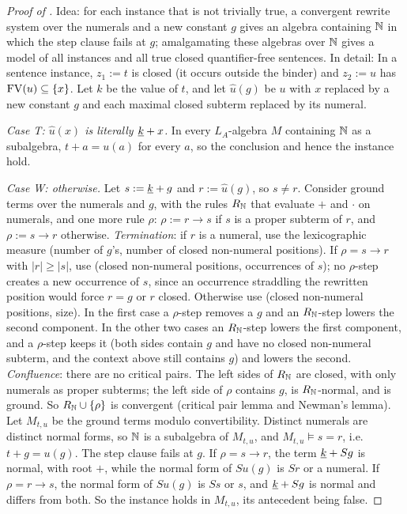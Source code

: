 \begin{proof}[Proof of ]
Idea: for each instance that is not trivially true, a convergent rewrite system over the numerals and a new constant
$g$ gives an algebra containing $\mathbb{N}$ in which the step clause fails at $g$; amalgamating these algebras over $\mathbb{N}$ gives
a model of all instances and all true closed quantifier-free sentences. In detail:
In a sentence instance, $z_1:=t$ is closed (it occurs outside the binder) and $z_2:=u$ has $\mathrm{FV}(u)\subseteq\{x\}$.
Let $k$ be the value of $t$, and let $\hat u(g)$ be $u$ with $x$ replaced by a new constant $g$ and each maximal closed
subterm replaced by its numeral.

\emph{Case T: $\hat u(x)$ is literally $\underline{k}+x$.} In every $L_A$-algebra $M$ containing $\mathbb{N}$ as a subalgebra, $t+a=u(a)$
for every $a$, so the conclusion and hence the instance hold.

\emph{Case W: otherwise.} Let $s:=\underline{k}+g$ and $r:=\hat u(g)$, so $s\ne r$. Consider ground terms over the numerals and
$g$, with the rules $R_{\mathbb{N}}$ that evaluate $+$ and $\cdot$ on numerals, and one more rule $\rho$: $\rho:=r\to s$ if $s$ is a
proper subterm of $r$, and $\rho:=s\to r$ otherwise. \emph{Termination}: if $r$ is a numeral, use the lexicographic
measure (number of $g$'s, number of closed non-numeral positions). If $\rho=s\to r$ with $|r|\ge|s|$, use (closed
non-numeral positions, occurrences of $s$); no $\rho$-step creates a new occurrence of $s$, since an occurrence straddling
the rewritten position would force $r=g$ or $r$ closed. Otherwise use (closed non-numeral positions, size). In the
first case a $\rho$-step removes a $g$ and an $R_{\mathbb{N}}$-step lowers the second component. In the other two cases an
$R_{\mathbb{N}}$-step lowers the first component, and a $\rho$-step keeps it (both sides contain $g$ and have no closed
non-numeral subterm, and the context above still contains $g$) and lowers the second. \emph{Confluence}: there are no critical pairs. The left sides of $R_{\mathbb{N}}$ are closed, with only numerals as
proper subterms; the left side of $\rho$ contains $g$, is $R_{\mathbb{N}}$-normal, and is ground. So $R_{\mathbb{N}}\cup\{\rho\}$ is convergent
(critical pair lemma and Newman's lemma). Let $M_{t,u}$ be the ground terms modulo convertibility. Distinct numerals are
distinct normal forms, so $\mathbb{N}$ is a subalgebra of $M_{t,u}$, and $M_{t,u}\models s=r$, i.e.\ $t+g=u(g)$. The step clause
fails at $g$. If $\rho=s\to r$, the term $\underline{k}+Sg$ is normal, with root $+$, while the normal form of $Su(g)$ is $Sr$
or a numeral. If $\rho=r\to s$, the normal form of $Su(g)$ is $Ss$ or $s$, and $\underline{k}+Sg$ is normal and differs from both.
So the instance holds in $M_{t,u}$, its antecedent being false.


\end{proof}
